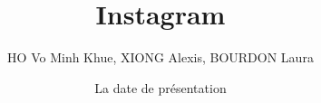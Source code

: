 \documentclass[aspectratio=169]{beamer}
\title{Instagram}
\author{HO Vo Minh Khue, XIONG Alexis, BOURDON Laura}
\institute{LAK}
\date{La date de présentation}
\begin{document}

\begin{frame}
  \titlepage
\end{frame}

\end{document}
